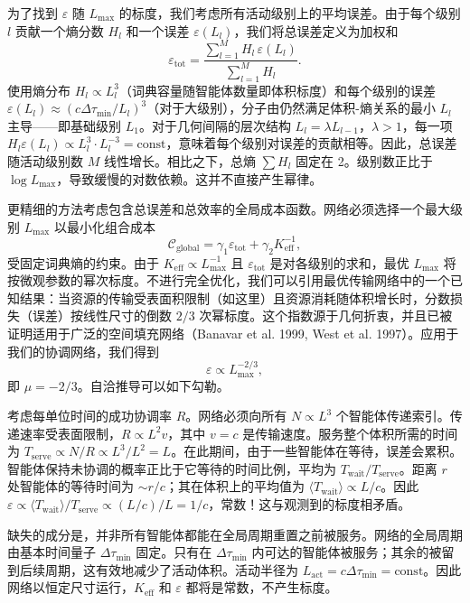 \documentclass[11pt,a4paper]{article}
\begin{document}
	为了找到 \(\varepsilon\) 随 \(L_{\max}\) 的标度，我们考虑所有活动级别上的平均误差。由于每个级别 \(l\) 贡献一个熵分数 \(H_l\) 和一个误差 \(\varepsilon(L_l)\)，我们将总误差定义为加权和
	\[
	\varepsilon_{\mathrm{tot}} = \frac{\sum_{l=1}^{M} H_l\, \varepsilon(L_l)}{\sum_{l=1}^{M} H_l}.
	\]
	使用熵分布 \(H_l \propto L_l^3\)（词典容量随智能体数量即体积标度）和每个级别的误差 \(\varepsilon(L_l) \approx (c\Delta\tau_{\min}/L_l)^3\)（对于大级别），分子由仍然满足体积-熵关系的最小 \(L_l\) 主导——即基础级别 \(L_1\)。对于几何间隔的层次结构 \(L_l = \lambda L_{l-1}\)，\(\lambda > 1\)，每一项 \(H_l\varepsilon(L_l) \propto L_l^3 \cdot L_l^{-3} = \text{const}\)，意味着每个级别对误差的贡献相等。因此，总误差随活动级别数 \(M\) 线性增长。相比之下，总熵 \(\sum H_l\) 固定在 2。级别数正比于 \(\log L_{\max}\)，导致缓慢的对数依赖。这并不直接产生幂律。
	
	更精细的方法考虑包含总误差和总效率的全局成本函数。网络必须选择一个最大级别 \(L_{\max}\) 以最小化组合成本
	\[
	\mathcal{C}_{\mathrm{global}} = \gamma_1 \varepsilon_{\mathrm{tot}} + \gamma_2 K_{\mathrm{eff}}^{-1},
	\]
	受固定词典熵的约束。由于 \(K_{\mathrm{eff}} \propto L_{\max}^{-1}\) 且 \(\varepsilon_{\mathrm{tot}}\) 是对各级别的求和，最优 \(L_{\max}\) 将按微观参数的幂次标度。不进行完全优化，我们可以引用最优传输网络中的一个已知结果：当资源的传输受表面积限制（如这里）且资源消耗随体积增长时，分数损失（误差）按线性尺寸的倒数 \(2/3\) 次幂标度。这个指数源于几何折衷，并且已被证明适用于广泛的空间填充网络（Banavar et al. 1999, West et al. 1997）。应用于我们的协调网络，我们得到
	\[
	\varepsilon \propto L_{\max}^{-2/3},
	\]
	即 \(\mu = -2/3\)。自洽推导可以如下勾勒。
	
	考虑每单位时间的成功协调率 \(R\)。网络必须向所有 \(N \propto L^3\) 个智能体传递索引。传递速率受表面限制，\(R \propto L^2 v\)，其中 \(v = c\) 是传输速度。服务整个体积所需的时间为 \(T_{\mathrm{serve}} \propto N/R \propto L^3/L^2 = L\)。在此期间，由于一些智能体在等待，误差会累积。智能体保持未协调的概率正比于它等待的时间比例，平均为 \(T_{\mathrm{wait}}/T_{\mathrm{serve}}\)。距离 \(r\) 处智能体的等待时间为 \(\sim r/c\)；其在体积上的平均值为 \(\langle T_{\mathrm{wait}} \rangle \propto L/c\)。因此 \(\varepsilon \propto \langle T_{\mathrm{wait}} \rangle/T_{\mathrm{serve}} \propto (L/c)/L = 1/c\)，常数！这与观测到的标度相矛盾。
	
	缺失的成分是，并非所有智能体都能在全局周期重置之前被服务。网络的全局周期由基本时间量子 \(\Delta\tau_{\min}\) 固定。只有在 \(\Delta\tau_{\min}\) 内可达的智能体被服务；其余的被留到后续周期，这有效地减少了活动体积。活动半径为 \(L_{\mathrm{act}} = c\Delta\tau_{\min} = \text{const}\)。因此网络以恒定尺寸运行，\(K_{\mathrm{eff}}\) 和 \(\varepsilon\) 都将是常数，不产生标度。
	
\end{document}
